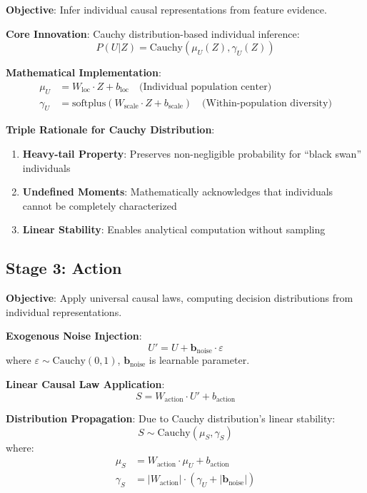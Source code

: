\documentclass[conference]{IEEEtran}
\newcommand{\cauchy}{\text{Cauchy}}
\begin{document}
\textbf{Objective}: Infer individual causal representations from feature evidence.

\textbf{Core Innovation}: Cauchy distribution-based individual inference:
\begin{equation}
P(U|Z) = \cauchy(\mu_U(Z), \gamma_U(Z))
\end{equation}

\textbf{Mathematical Implementation}:
\begin{align}
\mu_U &= W_{\text{loc}} \cdot Z + b_{\text{loc}} \quad \text{(Individual population center)} \\
\gamma_U &= \text{softplus}(W_{\text{scale}} \cdot Z + b_{\text{scale}}) \quad \text{(Within-population diversity)}
\end{align}

\textbf{Triple Rationale for Cauchy Distribution}:
\begin{enumerate}
\item \textbf{Heavy-tail Property}: Preserves non-negligible probability for ``black swan'' individuals
\item \textbf{Undefined Moments}: Mathematically acknowledges that individuals cannot be completely characterized  
\item \textbf{Linear Stability}: Enables analytical computation without sampling
\end{enumerate}

\subsection{Stage 3: Action}

\textbf{Objective}: Apply universal causal laws, computing decision distributions from individual representations.

\textbf{Exogenous Noise Injection}:
\begin{equation}
U' = U + \mathbf{b}_{\text{noise}} \cdot \varepsilon
\end{equation}
where $\varepsilon \sim \cauchy(0, 1)$, $\mathbf{b}_{\text{noise}}$ is learnable parameter.

\textbf{Linear Causal Law Application}:
\begin{equation}
S = W_{\text{action}} \cdot U' + b_{\text{action}}
\end{equation}

\textbf{Distribution Propagation}: Due to Cauchy distribution's linear stability:
\begin{equation}
S \sim \cauchy(\mu_S, \gamma_S)
\end{equation}
where:
\begin{align}
\mu_S &= W_{\text{action}} \cdot \mu_U + b_{\text{action}} \\
\gamma_S &= |W_{\text{action}}| \cdot (\gamma_U + |\mathbf{b}_{\text{noise}}|)
\end{align}
\end{document}
